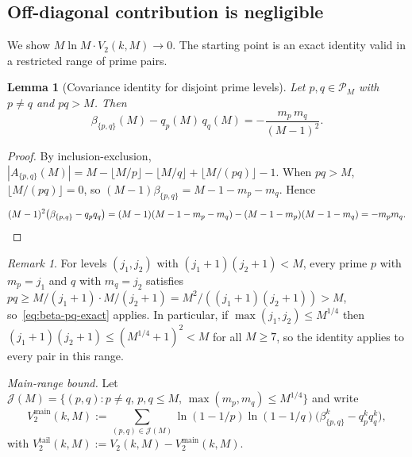 \documentclass[11pt]{article}
\newtheorem{lemma}[theorem]{Lemma}
\theoremstyle{remark}
\newtheorem{remark}[theorem]{Remark}
\newcommand{\PM}{\mathcal{P}_M}
\begin{document}
\subsection{Off-diagonal contribution is negligible}\label{sec:variance-V2}

We show $M \ln M \cdot V_2(k, M) \to 0$. The starting point is an exact identity valid in a restricted range of prime pairs.

\begin{lemma}[Covariance identity for disjoint prime levels]\label{lem:beta-pq-exact}
Let $p, q \in \PM$ with $p \neq q$ and $pq > M$. Then
\begin{equation}\label{eq:beta-pq-exact}
\beta_{\{p,q\}}(M) - q_p(M)\, q_q(M) = -\frac{m_p\, m_q}{(M-1)^2}.
\end{equation}
\end{lemma}
\begin{proof}
By inclusion-exclusion, $|A_{\{p,q\}}(M)| = M - \lfloor M/p \rfloor - \lfloor M/q \rfloor + \lfloor M/(pq) \rfloor - 1$. When $pq > M$, $\lfloor M/(pq) \rfloor = 0$, so $(M-1)\beta_{\{p,q\}} = M - 1 - m_p - m_q$. Hence
\[
(M-1)^2\bigl(\beta_{\{p,q\}} - q_p q_q\bigr) = (M-1)(M - 1 - m_p - m_q) - (M-1-m_p)(M-1-m_q) = -m_p m_q. \qedhere
\]
\end{proof}

\begin{remark}\label{rem:pq-gt-M-automatic}
For levels $(j_1, j_2)$ with $(j_1+1)(j_2+1) < M$, every prime $p$ with $m_p = j_1$ and $q$ with $m_q = j_2$ satisfies $pq \geq M/(j_1+1) \cdot M/(j_2+1) = M^2/((j_1+1)(j_2+1)) > M$, so~\eqref{eq:beta-pq-exact} applies. In particular, if $\max(j_1, j_2) \leq M^{1/4}$ then $(j_1+1)(j_2+1) \leq (M^{1/4}+1)^2 < M$ for all $M \geq 7$, so the identity applies to every pair in this range.
\end{remark}

\emph{Main-range bound.}
Let $\mathcal{J}(M) = \{(p,q) : p \neq q,\, p, q \leq M,\, \max(m_p, m_q) \leq M^{1/4}\}$ and write
\[
V_2^{\mathrm{main}}(k, M) := \sum_{(p,q) \in \mathcal{J}(M)} \ln(1 - 1/p) \ln(1 - 1/q) \bigl(\beta_{\{p,q\}}^k - q_p^k q_q^k\bigr),
\]
with $V_2^{\mathrm{tail}}(k, M) := V_2(k, M) - V_2^{\mathrm{main}}(k, M)$.
\end{document}

